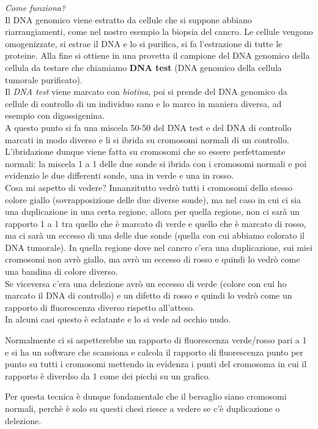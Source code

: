 \documentclass[11pt]{book}
\begin{document}
\emph{Come funziona?}\\
Il DNA genomico viene estratto da cellule che si suppone abbiano riarrangiamenti, come  nel nostro esempio la biopsia del cancro. Le cellule vengono omogenizzate, si estrae il DNA e lo si purifica, si fa l’estrazione di tutte le proteine. Alla fine si ottiene in una provetta il campione del DNA genomico della cellula da testare che chiamiamo \textbf{DNA test} (DNA genomico della cellula tumorale purificato).\\
Il \emph{DNA test} viene marcato con \emph{biotina}, poi si prende del DNA genomico da cellule di controllo di un individuo sano e lo marco in maniera diversa, ad esempio con digossigenina.\\
A questo punto si fa una miscela 50-50 del DNA test e del DNA di controllo marcati in modo diverso e li si ibrida su cromosomi normali di un controllo.\\
L’ibridazione dunque viene fatta su cromosomi che so essere perfettamente normali: la miscela 1 a 1 delle due sonde si ibrida con i cromosomi normali e poi evidenzio le due differenti sonde, una in verde e una in rosso.\\
Cosa mi aspetto di vedere? Innanzitutto vedrò tutti i cromosomi dello stesso colore giallo (sovrapposizione delle due diverse sonde), ma nel caso in cui ci sia una duplicazione in una certa regione, allora per quella regione, non ci sarà un rapporto 1 a 1 tra quello che è marcato di verde e quello che è marcato di rosso, ma ci sarà un eccesso di una delle due sonde (quella con cui abbiamo colorato il DNA tumorale). In quella regione dove nel cancro c’era una duplicazione, sui miei cromosomi non avrò giallo, ma avrò un eccesso di rosso e quindi lo vedrò come una bandina di colore diverso.\\
Se viceversa c’era una delezione avrò un eccesso di verde (colore con cui ho marcato il DNA di controllo) e un difetto di rosso e quindi lo vedrò come un rapporto di fluorescenza diverso rispetto all’atteso.\\
In alcuni casi questo è eclatante e lo si vede ad occhio nudo.

Normalmente ci si aspetterebbe un rapporto di fluorescenza verde/rosso pari a 1 e si ha un software che scansiona e calcola il rapporto di fluorescenza punto per punto su tutti i cromosomi mettendo in evidenza i punti del cromosoma in cui il rapporto è diverdso da 1 come dei picchi su un grafico.

Per questa tecnica è dunque fondamentale che il bersaglio siano cromosomi normali, perchè è solo su questi chesi riesce a vedere se c’è duplicazione o delezione.
\end{document}
